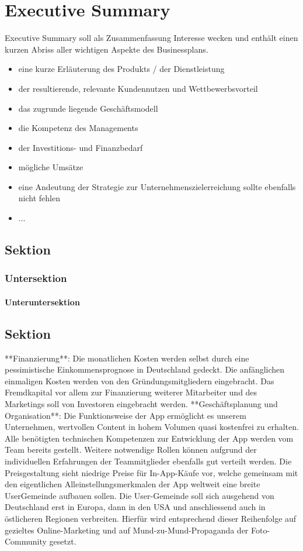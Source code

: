 \chapter{Executive Summary}

Executive Summary soll als Zusammenfassung Interesse wecken und enthält einen kurzen Abriss aller wichtigen Aspekte des Businessplans.
\begin{itemize}
\item eine kurze Erläuterung des Produkts / der Dienstleistung
\item der resultierende, relevante Kundennutzen und Wettbewerbsvorteil
\item das zugrunde liegende Geschäftsmodell
\item die Kompetenz des Managements
\item der Investitions- und Finanzbedarf
\item mögliche Umsätze
\item eine Andeutung der Strategie zur Unternehmenszielerreichung sollte ebenfalls nicht fehlen
\item ...
\end{itemize}

\section{Sektion}

\subsection{Untersektion}

\subsubsection{Unteruntersektion}

\section{Sektion}


**Finanzierung**: Die monatlichen Kosten werden selbst durch eine pessimistische Einkommensprognose in Deutschland gedeckt. Die anfänglichen einmaligen Kosten werden von den Gründungsmitgliedern eingebracht. Das Fremdkapital vor allem zur Finanzierung weiterer Mitarbeiter und des Marketings soll von Investoren eingebracht werden.
**Geschäftsplanung und Organisation**: Die Funktionsweise der App ermöglicht es unserem Unternehmen, wertvollen Content in hohem Volumen quasi kostenfrei zu erhalten. Alle benötigten technischen Kompetenzen zur Entwicklung der App werden vom Team bereits gestellt. Weitere notwendige Rollen können aufgrund der individuellen Erfahrungen der Teammitglieder ebenfalls gut verteilt werden.
Die Preisgestaltung sieht niedrige Preise für In-App-Käufe vor, welche gemeinsam mit den eigentlichen Alleinstellungsmerkmalen der App weltweit eine breite UserGemeinde aufbauen sollen. Die User-Gemeinde soll sich ausgehend von Deutschland erst in Europa, dann in den USA und anschliessend auch in östlicheren Regionen verbreiten. Hierfür wird entsprechend dieser Reihenfolge auf gezieltes Online-Marketing und auf Mund-zu-Mund-Propaganda der Foto-Community gesetzt.
